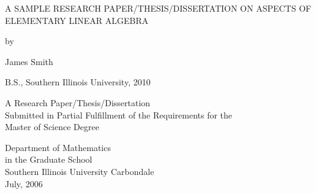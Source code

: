 \begin{center}


A SAMPLE RESEARCH PAPER/THESIS/DISSERTATION ON ASPECTS OF \\
ELEMENTARY LINEAR ALGEBRA

\vskip 1.8in

by

James Smith

B.S., Southern Illinois University, 2010

\vskip 2in

\vbox{\baselineskip=14pt
A Research Paper/Thesis/Dissertation \\
Submitted in Partial Fulfillment of the Requirements for the \\
Master of Science Degree
}

\vskip 2in


\vbox{\baselineskip=14pt
Department of Mathematics \\
in the Graduate School \\
Southern Illinois University Carbondale \\
July, 2006
}

\end{center}
